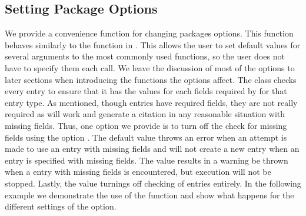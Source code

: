 \documentclass[article]{jss}\usepackage[]{graphicx}\usepackage[]{color}
\begin{document}
\subsection{Setting Package Options}
We provide a convenience function  for changing packages options.  This function behaves similarly to the  function in .  This allows the user to set default values for several arguments to the most commonly used functions, so the user does not have to specify them each call.  We leave the discussion of most of the options to later sections when introducing the functions the options affect.  The  class checks every entry to ensure that it has the values for each fields required by \Bibtex{} for that entry type.  As mentioned, though entries have required fields, they are not really required as \Biblatex{} will work and generate a citation in any reasonable situation with missing fields.  Thus, one option we provide is to turn off the check for missing fields using the option .  The default value  throws an error when an attempt is made to use an entry with missing fields and will not create a new entry when an entry is specified with missing fields.  The value  results in a warning be thrown when a entry with missing fields is encountered, but execution will not be stopped.  Lastly, the value  turnings off checking of entries entirely.  In the following example we demonstrate the use of the  function and show what happens for the different settings of the  option.
\end{document}

